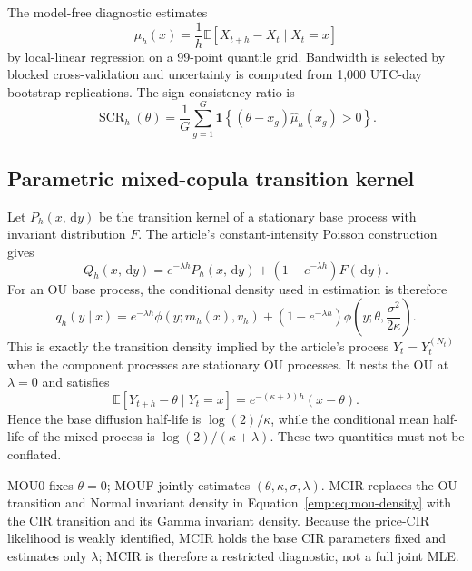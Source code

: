 \documentclass[11pt]{article}
\newcommand{\E}{\mathbb{E}}
\newcommand{\1}{\mathbf{1}}
\newcommand{\dd}{\,\mathrm{d}}
\begin{document}
The model-free diagnostic estimates
\begin{equation}
\mu_h(x)=\frac{1}{h}\E[X_{t+h}-X_t\mid X_t=x]
\label{emp:eq:finite-drift}
\end{equation}
by local-linear regression on a 99-point quantile grid.  Bandwidth is selected by
blocked cross-validation and uncertainty is computed from 1,000 UTC-day bootstrap
replications.  The sign-consistency ratio is
\begin{equation}
\operatorname{SCR}_h(\theta)
=\frac{1}{G}\sum_{g=1}^G
\bm{1}\!\left\{(\theta-x_g)\widehat\mu_h(x_g)>0\right\}.
\label{emp:eq:scr}
\end{equation}

\subsection{Parametric mixed-copula transition kernel}

Let $P_h(x,\dd y)$ be the transition kernel of a stationary base process with
invariant distribution $F$.  The article's constant-intensity Poisson
construction gives
\begin{equation}
Q_h(x,\dd y)
=e^{-\lambda h}P_h(x,\dd y)
+\left(1-e^{-\lambda h}\right)F(\dd y).
\label{emp:eq:mixed-kernel}
\end{equation}
For an OU base process, the conditional density used in estimation is therefore
\begin{equation}
q_h(y\mid x)
=e^{-\lambda h}\phi\!\left(y;m_h(x),v_h\right)
+\left(1-e^{-\lambda h}\right)
\phi\!\left(y;\theta,\frac{\sigma^2}{2\kappa}\right).
\label{emp:eq:mou-density}
\end{equation}
This is exactly the transition density implied by the article's process
$Y_t=Y_t^{(N_t)}$ when the component processes are stationary OU processes.
It nests the OU at $\lambda=0$ and satisfies
\begin{equation}
\E[Y_{t+h}-\theta\mid Y_t=x]
=e^{-(\kappa+\lambda)h}(x-\theta).
\label{emp:eq:mou-mean}
\end{equation}
Hence the base diffusion half-life is $\log(2)/\kappa$, while the conditional
mean half-life of the mixed process is $\log(2)/(\kappa+\lambda)$.  These two
quantities must not be conflated.

MOU0 fixes $\theta=0$; MOUF jointly estimates
$(\theta,\kappa,\sigma,\lambda)$.  MCIR replaces the OU transition and Normal
invariant density in Equation~\eqref{emp:eq:mou-density} with the CIR transition
and its Gamma invariant density.  Because the price-CIR likelihood is weakly
identified, MCIR holds the base CIR parameters fixed and estimates only
$\lambda$; MCIR is therefore a restricted diagnostic, not a full joint MLE.
\end{document}

